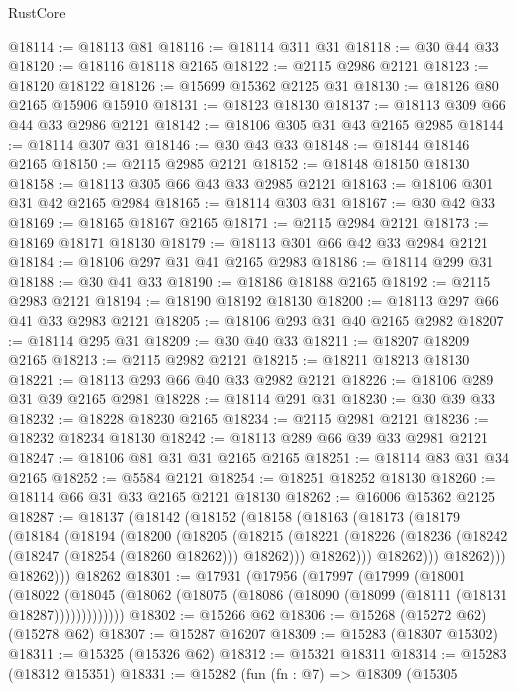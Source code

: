 \begin{lexlean}{RustCore}
\begin{coremodule}
@18114 := @18113 @81
@18116 := @18114 @311 @31
@18118 := @30 @44 @33
@18120 := @18116 @18118 @2165
@18122 := @2115 @2986 @2121
@18123 := @18120 @18122
@18126 := @15699 @15362 @2125 @31
@18130 := @18126 @80 @2165 @15906 @15910
@18131 := @18123 @18130
@18137 := @18113 @309 @66 @44 @33 @2986 @2121
@18142 := @18106 @305 @31 @43 @2165 @2985
@18144 := @18114 @307 @31
@18146 := @30 @43 @33
@18148 := @18144 @18146 @2165
@18150 := @2115 @2985 @2121
@18152 := @18148 @18150 @18130
@18158 := @18113 @305 @66 @43 @33 @2985 @2121
@18163 := @18106 @301 @31 @42 @2165 @2984
@18165 := @18114 @303 @31
@18167 := @30 @42 @33
@18169 := @18165 @18167 @2165
@18171 := @2115 @2984 @2121
@18173 := @18169 @18171 @18130
@18179 := @18113 @301 @66 @42 @33 @2984 @2121
@18184 := @18106 @297 @31 @41 @2165 @2983
@18186 := @18114 @299 @31
@18188 := @30 @41 @33
@18190 := @18186 @18188 @2165
@18192 := @2115 @2983 @2121
@18194 := @18190 @18192 @18130
@18200 := @18113 @297 @66 @41 @33 @2983 @2121
@18205 := @18106 @293 @31 @40 @2165 @2982
@18207 := @18114 @295 @31
@18209 := @30 @40 @33
@18211 := @18207 @18209 @2165
@18213 := @2115 @2982 @2121
@18215 := @18211 @18213 @18130
@18221 := @18113 @293 @66 @40 @33 @2982 @2121
@18226 := @18106 @289 @31 @39 @2165 @2981
@18228 := @18114 @291 @31
@18230 := @30 @39 @33
@18232 := @18228 @18230 @2165
@18234 := @2115 @2981 @2121
@18236 := @18232 @18234 @18130
@18242 := @18113 @289 @66 @39 @33 @2981 @2121
@18247 := @18106 @81 @31 @31 @2165 @2165
@18251 := @18114 @83 @31 @34 @2165
@18252 := @5584 @2121
@18254 := @18251 @18252 @18130
@18260 := @18114 @66 @31 @33 @2165 @2121 @18130
@18262 := @16006 @15362 @2125
@18287 := @18137
    (@18142
      (@18152
        (@18158
          (@18163
            (@18173
              (@18179
                (@18184
                  (@18194
                    (@18200
                      (@18205
                        (@18215
                          (@18221
                            (@18226 (@18236 (@18242 (@18247 (@18254 (@18260 @18262))) @18262)))
                            @18262)))
                      @18262)))
                @18262)))
          @18262)))
    @18262
@18301 := @17931
    (@17956
      (@17997
        (@17999
          (@18001
            (@18022
              (@18045 (@18062 (@18075 (@18086 (@18090 (@18099 (@18111 (@18131 @18287)))))))))))))
@18302 := @15266 @62
@18306 := @15268 (@15272 @62) (@15278 @62)
@18307 := @15287 @16207
@18309 := @15283 (@18307 @15302)
@18311 := @15325 (@15326 @62)
@18312 := @15321 @18311
@18314 := @15283 (@18312 @15351)
@18331 := @15282
    (fun (fn : @7) =>
    @18309
      (@15305

\end{coremodule}
\end{lexlean}
